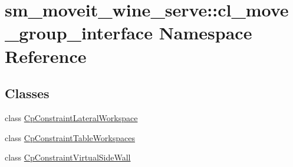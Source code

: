\hypertarget{namespacesm__moveit__wine__serve_1_1cl__move__group__interface}{}\section{sm\+\_\+moveit\+\_\+wine\+\_\+serve\+:\+:cl\+\_\+move\+\_\+group\+\_\+interface Namespace Reference}
\label{namespacesm__moveit__wine__serve_1_1cl__move__group__interface}
\subsection*{Classes}
\begin{DoxyCompactItemize}
\item 
class \hyperlink{classsm__moveit__wine__serve_1_1cl__move__group__interface_1_1CpConstraintLateralWorkspace}{Cp\+Constraint\+Lateral\+Workspace}
\item 
class \hyperlink{classsm__moveit__wine__serve_1_1cl__move__group__interface_1_1CpConstraintTableWorkspaces}{Cp\+Constraint\+Table\+Workspaces}
\item 
class \hyperlink{classsm__moveit__wine__serve_1_1cl__move__group__interface_1_1CpConstraintVirtualSideWall}{Cp\+Constraint\+Virtual\+Side\+Wall}
\end{DoxyCompactItemize}
